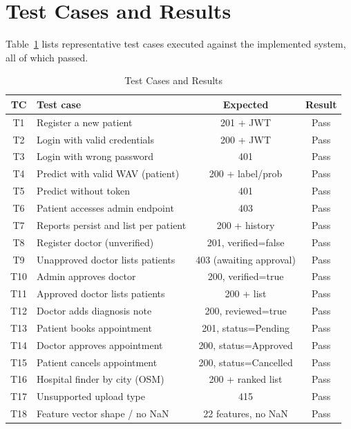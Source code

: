 \documentclass[oneside,a4paper,12pt]{report}
\begin{document}
\section{Test Cases and Results}
Table~\ref{tab:testcases} lists representative test cases executed against the
implemented system, all of which passed.

\begin{table}[H]
\centering
\caption{Test Cases and Results}
\label{tab:testcases}
\def\arraystretch{1.2}
\begin{tabularx}{\textwidth}{|c|X|c|c|}
\hline
\textbf{TC} & \textbf{Test case} & \textbf{Expected} & \textbf{Result} \\ \hline
T1 & Register a new patient & 201 + JWT & Pass \\ \hline
T2 & Login with valid credentials & 200 + JWT & Pass \\ \hline
T3 & Login with wrong password & 401 & Pass \\ \hline
T4 & Predict with valid WAV (patient) & 200 + label/prob & Pass \\ \hline
T5 & Predict without token & 401 & Pass \\ \hline
T6 & Patient accesses admin endpoint & 403 & Pass \\ \hline
T7 & Reports persist and list per patient & 200 + history & Pass \\ \hline
T8 & Register doctor (unverified) & 201, verified=false & Pass \\ \hline
T9 & Unapproved doctor lists patients & 403 (awaiting approval) & Pass \\ \hline
T10 & Admin approves doctor & 200, verified=true & Pass \\ \hline
T11 & Approved doctor lists patients & 200 + list & Pass \\ \hline
T12 & Doctor adds diagnosis note & 200, reviewed=true & Pass \\ \hline
T13 & Patient books appointment & 201, status=Pending & Pass \\ \hline
T14 & Doctor approves appointment & 200, status=Approved & Pass \\ \hline
T15 & Patient cancels appointment & 200, status=Cancelled & Pass \\ \hline
T16 & Hospital finder by city (OSM) & 200 + ranked list & Pass \\ \hline
T17 & Unsupported upload type & 415 & Pass \\ \hline
T18 & Feature vector shape / no NaN & 22 features, no NaN & Pass \\ \hline
\end{tabularx}
\end{table}
\end{document}
